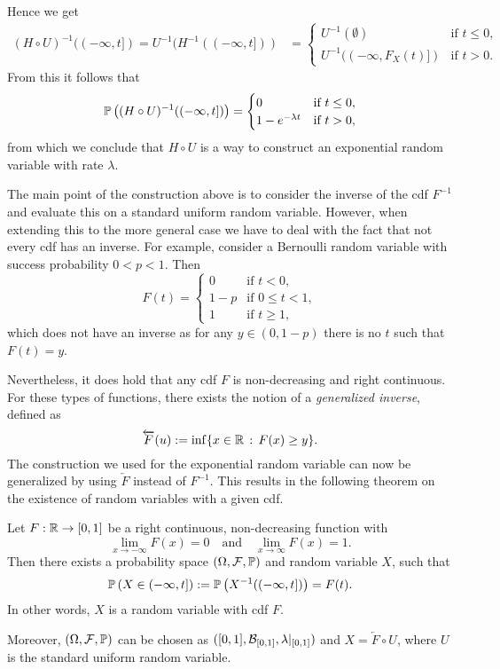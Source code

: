 Hence we get
\begin{align*}
	(H \circ U)^{-1}((-\infty, t]) = U^{-1}(H^{-1}((-\infty, t]))
	&= \begin{cases}
		U^{-1}(\emptyset) &\text{if } t \le 0,\\
		U^{-1}((-\infty, F_X(t)]) &\text{if } t > 0.
	\end{cases}
\end{align*}
From this it follows that 
\[
	\mathbb P\left((H \circ U)^{-1}((-\infty, t])\right) = \begin{cases}
			0 &\text{if } t \le 0,\\
			1-e^{-\lambda t} &\text{if } t > 0,
		\end{cases}
\]
from which we conclude that $H \circ U$ is a way to construct an exponential random variable with rate $\lambda$.

The main point of the construction above is to consider the inverse of the cdf $F^{-1}$ and evaluate this on a standard uniform random variable. However, when extending this to the more general case we have to deal with the fact that not every cdf has an inverse. For example, consider a Bernoulli random variable with success probability $0 < p < 1$. Then
\[
	F(t) = \begin{cases}
		0 &\text{if } t < 0, \\
		1-p &\text{if } 0 \le t < 1, \\
		1 &\text{if } t \ge 1,
	\end{cases}
\] 
which does not have an inverse as for any $y \in (0,1-p)$ there is no $t$ such that $F(t) = y$.

Nevertheless, it does hold that any cdf $F$ is non-decreasing and right continuous. For these types of functions, there exists the notion of a \emph{generalized inverse}, defined as
\begin{equation}
	\overleftarrow{F}(u) := \inf\{ x \in \mathbb R \, : \, F(x) \ge y\}. 
\end{equation}
The construction we used for the exponential random variable can now be generalized by using $\overleftarrow{F}$ instead of $F^{-1}$. This results in the following theorem on the existence of random variables with a given cdf.

\begin{theorem}\label{thm:construction_random_variable}
Let $F : \mathbb R \to [0,1]$ be a right continuous, non-decreasing function with 
\[
	\lim_{x \to -\infty} F(x) = 0 \quad \text{and} \quad \lim_{x \to \infty} F(x) = 1.
\]
Then there exists a probability space  $(\Omega,\mathcal F, \mathbb P)$ and random variable $X$, such that 
\[
	\mathbb P\left(X \in (-\infty,t]\right) := \mathbb P\left(X^{-1}((-\infty,t])\right) = F(t).
\]
In other words, $X$ is a random variable with cdf $F$.

Moreover, $(\Omega,\mathcal F, \mathbb P)$ can be chosen as $([0,1], \mathcal B_{[0,1]}, \lambda|_{[0,1]})$ and $X = \overleftarrow{F}\circ U$, where $U$ is the standard uniform random variable.
\end{theorem}

